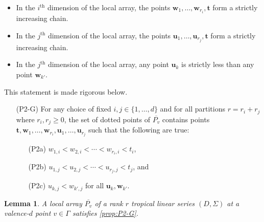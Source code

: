 \documentclass{amsart}
\makeatletter
\newtheorem{lemma}[theorem]{Lemma}
\def\namedlabel#1#2{\begingroup
	#2%
	\def\@currentlabel{#2}%
	\phantomsection\label{#1}\endgroup
}
\makeatother
\begin{document}
	\begin{itemize}
		\item In the $i^{\text{th}}$ dimension of the local array, the points $\mathbf{w}_1, \ldots, \mathbf{w}_{r_i}, \mathbf{t}$ form a strictly increasing chain.
		\item In the $j^{\text{th}}$ dimension of the local array, the points $\mathbf{u}_1, \ldots, \mathbf{u}_{r_j}, \mathbf{t}$ form a strictly increasing chain.
		\item In the $j^{\text{th}}$ dimension of the local array, any point $\mathbf{u}_{k}$ is strictly less than any point $\mathbf{w}_{k'}$.
	\end{itemize}
	
	This statement is made rigorous below.
	
	\begin{enumerate}
		\item [\namedlabel{prop:P2-G}{(P2-G)}] For any choice of fixed $i, j \in \{ 1, \ldots, d \}$ and for all partitions $r = r_{i} + r_{j}$ where $r_{i}, r_{j} \geq 0$, the set of dotted points of $\overline{P_v}$ contains points $\mathbf{t}, \mathbf{w}_1, \ldots, \mathbf{w}_{r_i}, \mathbf{u}_1, \ldots, \mathbf{u}_{r_j}$ such that the following are true:
		\begin{enumerate}
			\item [\namedlabel{prop:P2a}{(P2a)}] $w_{1,i} < w_{2,i} < \cdots < w_{r_{i}, i} < t_{i}$,
			\item [\namedlabel{prop:P2b}{(P2b)}] $u_{1,j} < u_{2,j} < \cdots < u_{r_{j}, j} < t_{j}$, and
			\item [\namedlabel{prop:P2c}{(P2c)}] $u_{k,j} < w_{k',j}$ for all $\mathbf{u}_k, \mathbf{w}_{k'}$.
		\end{enumerate}
	\end{enumerate}
	
	\begin{lemma}
		\label{Lem:tls-local-arrays-generalization}
		A local array $\overline{P_v}$ of a rank $r$ tropical linear series $(D, \Sigma)$ at a valence-$d$ point $v \in \Gamma$ satisfies \ref{prop:P2-G}.
	\end{lemma}
	
\end{document}
